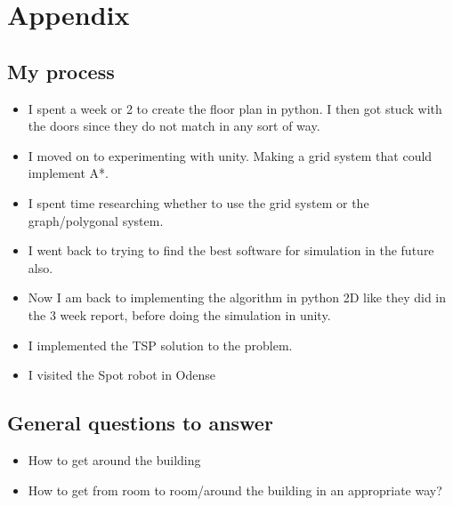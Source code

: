 \section*{Appendix}
\subsection*{My process}
\begin{itemize}
    \item I spent a week or 2 to create the floor plan in python. I then got stuck with the doors since they do not match in any sort of way.
    \item I moved on to experimenting with unity. Making a grid system that could implement A*.
    \item I spent time researching whether to use the grid system or the graph/polygonal system.
    \item I went back to trying to find the best software for simulation in the future also.
    \item Now I am back to implementing the algorithm in python 2D like they did in the 3 week report, before doing the simulation in unity.
    \item I implemented the TSP solution to the problem. 
    \item I visited the Spot robot in Odense
\end{itemize}

\subsection*{General questions to answer}
\begin{itemize}
    \item How to get around the building
    \item How to get from room to room/around the building in an appropriate way?
\end{itemize}